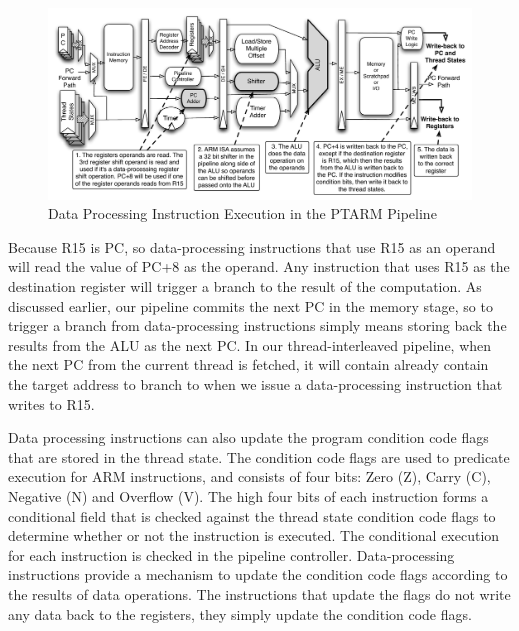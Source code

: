 \begin{figure}
  \vspace{-20pt}
  \begin{center}
    \includegraphics[scale=.54]{figs/data_processing_pipeline_implementation}
  \end{center}
  \vspace{-20pt}
  \caption{Data Processing Instruction Execution in the PTARM Pipeline}
  \label{fig:data_processing_pipeline_implementation}
\end{figure}

Because R15 is PC, so data-processing instructions that use R15 as an operand will read the value of PC+8 as the operand. 
Any instruction that uses R15 as the destination register will trigger a branch to the result of the computation.
As discussed earlier, our pipeline commits the next PC in the memory stage, so to trigger a branch from data-processing instructions simply means storing back the results from the ALU as the next PC.
In our thread-interleaved pipeline, when the next PC from the current thread is fetched, it will contain already contain the target address to branch to when we issue a data-processing instruction that writes to R15. 

Data processing instructions can also update the program condition code flags that are stored in the thread state. 
The condition code flags are used to predicate execution for ARM instructions, and consists of four bits: Zero (Z), Carry (C), Negative (N) and Overflow (V). 
The high four bits of each instruction forms a conditional field that is checked against the thread state condition code flags to determine whether or not the instruction is executed. 
The conditional execution for each instruction is checked in the pipeline controller. 
Data-processing instructions provide a mechanism to update the condition code flags according to the results of data operations.
The instructions that update the flags do not write any data back to the registers, they simply update the condition code flags.

